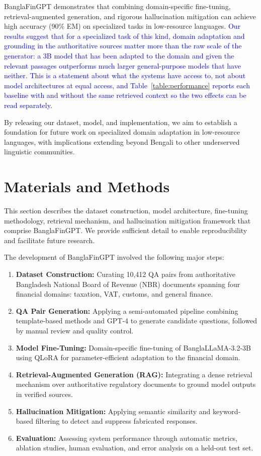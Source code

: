 \documentclass{article}
\newcommand{\revised}[1]{\textcolor{blue}{#1}}
\newcommand{\revised}[1]{#1}
\begin{document}
BanglaFinGPT demonstrates that combining domain-specific fine-tuning,
retrieval-augmented generation, and rigorous hallucination mitigation can achieve high
accuracy (90\% EM) on specialized tasks in low-resource languages. \revised{Our results
suggest that for a specialized task of this kind, domain adaptation and grounding in
the authoritative sources matter more than the raw scale of the generator: a 3B model
that has been adapted to the domain and given the relevant passages outperforms much
larger general-purpose models that have neither. This is a statement about what the
systems have access to, not about model architectures at equal access, and
Table~\ref{table:performance} reports each baseline with and without the same retrieved
context so the two effects can be read separately.}

By releasing our dataset, model, and implementation, we aim to establish a foundation
for future work on specialized domain adaptation in low-resource languages, with
implications extending beyond Bengali to other underserved linguistic communities.

\section{Materials and Methods}

This section describes the dataset construction, model architecture, fine-tuning
methodology, retrieval mechanism, and hallucination mitigation framework that comprise
BanglaFinGPT. We provide sufficient detail to enable reproducibility and facilitate
future research.

The development of BanglaFinGPT involved the following major steps:

\begin{enumerate}
    \item \textbf{Dataset Construction:} Curating 10,412 QA pairs from authoritative
    Bangladesh National Board of Revenue (NBR) \cite{NBR} documents spanning four
    financial domains: taxation, VAT, customs, and general finance.
    \item \textbf{QA Pair Generation:} Applying a semi-automated pipeline combining
    template-based methods and GPT-4 to generate candidate questions, followed by
    manual review and quality control.
    \item \textbf{Model Fine-Tuning:} Domain-specific fine-tuning of
    BanglaLLaMA-3.2-3B using QLoRA for parameter-efficient adaptation to the financial
    domain.
    \item \textbf{Retrieval-Augmented Generation (RAG):} Integrating a dense retrieval
    mechanism over authoritative regulatory documents to ground model outputs in
    verified sources.
    \item \textbf{Hallucination Mitigation:} Applying semantic similarity and
    keyword-based filtering to detect and suppress fabricated responses.
    \item \textbf{Evaluation:} Assessing system performance through automatic metrics,
    ablation studies, human evaluation, and error analysis on a held-out test set.
\end{enumerate}
\end{document}
